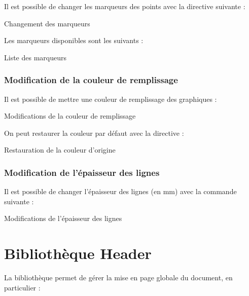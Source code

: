 {Il est possible de changer les marqueurs des points avec la directive suivante : 


\begin{Latex}{Changement des marqueurs}
\setMarker{\markerCircle}
\end{Latex}

Les marqueurs disponibles sont les suivants : \\

\begin{Latex}{Liste des marqueurs}
\markerNone
\markerCircle
\markerSquare
\markerTriangle
\markerDiamond
\markerStart
\end{Latex}

\subsection{Modification de la couleur de remplissage}

Il est possible de mettre une couleur de remplissage des graphiques :

\begin{Latex}{Modifications de la couleur de remplissage}
\end{Latex}

On peut restaurer la couleur par défaut avec la directive : \\

\begin{Latex}{Restauration de la couleur d'origine}
\setDefaultFillColor
\end{Latex}

\subsection{Modification de l'épaisseur des lignes}

Il est possible de changer l'épaisseur des lignes (en mm) avec la commande suivante :

\begin{Latex}{Modifications de l'épaisseur des lignes}
\end{Latex}

\chapter{Bibliothèque Header}

La bibliothèque  permet de gérer la mise en page globale du document, en particulier : 

}
